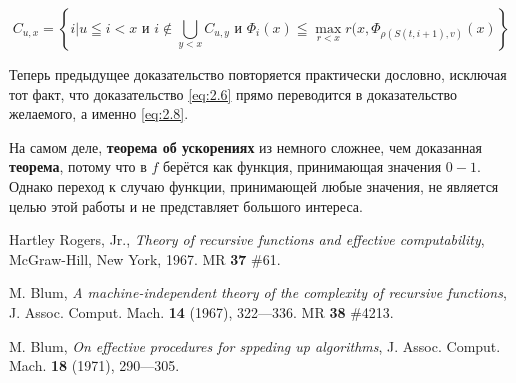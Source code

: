 \documentclass[a4paper,12pt]{report}
\begin{document}
\begin{equation}
C_{u,x} = \left\{ i | u \leqq i < x \mbox{ и } i \notin \bigcup_{y < x} C_{u,y} \mbox{ и } \Phi_i(x) \leqq \max_{r<x} r(x, \Phi_{\rho(S(t, i+1), v)}(x) \right\}
\end{equation}

Теперь предыдущее доказательство повторяется практически дословно, исключая тот факт, что доказательство \eqref{eq:2.6} прямо переводится в доказательство желаемого, а именно \eqref{eq:2.8}.

На самом деле, \textbf{теорема об ускорениях} из \cite{Blum} немного сложнее, чем доказанная \textbf{теорема}, потому что в \cite{Blum} $f$ берётся как функция, принимающая значения $0-1$. Однако переход к случаю функции, принимающей любые значения, не является целью этой работы и не представляет большого интереса. 


\begin{thebibliography}{9}

Hartley Rogers, Jr., \textit{Theory of recursive functions and effective computability},
McGraw-Hill, New York, 1967. MR \textbf{37} \#61.

M. Blum, \textit{A machine-independent theory of the complexity of recursive functions},
J. Assoc. Comput. Mach. \textbf{14} (1967), 322---336. MR \textbf{38} \#4213.

M. Blum, \textit{On effective procedures for sppeding up algorithms},
J. Assoc. Comput. Mach. \textbf{18} (1971), 290---305.

\end{thebibliography}
\end{document}
